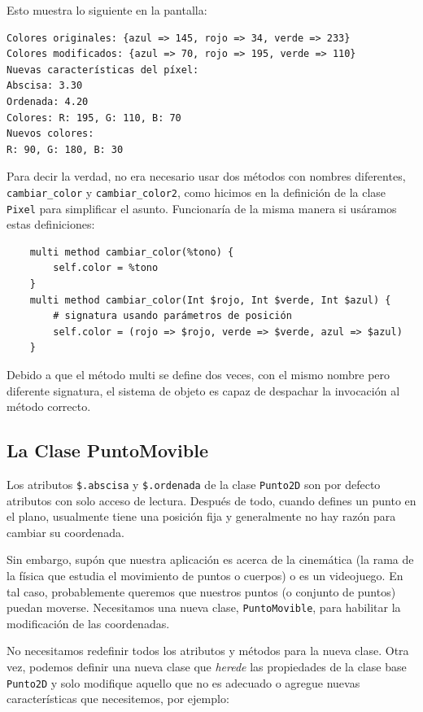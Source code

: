 Esto muestra lo siguiente en la pantalla:

\begin{verbatim}
Colores originales: {azul => 145, rojo => 34, verde => 233}
Colores modificados: {azul => 70, rojo => 195, verde => 110}
Nuevas características del píxel:
Abscisa: 3.30
Ordenada: 4.20
Colores: R: 195, G: 110, B: 70
Nuevos colores:  
R: 90, G: 180, B: 30 
\end{verbatim}

Para decir la verdad, no era necesario usar dos métodos con
nombres diferentes, \verb|cambiar_color| y \verb|cambiar_color2|,
como hicimos en la definición de la clase {\tt Pixel} para 
simplificar el asunto. Funcionaría de la misma manera si usáramos
estas definiciones:

\begin{verbatim}
    multi method cambiar_color(%tono) {
        self.color = %tono
    }
    multi method cambiar_color(Int $rojo, Int $verde, Int $azul) {
        # signatura usando parámetros de posición
        self.color = (rojo => $rojo, verde => $verde, azul => $azul)
    }
\end{verbatim} 

Debido a que el método multi se define dos veces, con el 
mismo nombre pero diferente signatura, el sistema de objeto
es capaz de despachar la invocación al método correcto.


\subsection{La Clase PuntoMovible}

Los atributos \verb|$.abscisa| y \verb|$.ordenada| de la 
clase {\tt Punto2D} son por defecto atributos con solo
acceso de lectura. Después de todo, cuando defines un punto
en el plano, usualmente tiene una posición fija y generalmente 
no hay razón para cambiar su coordenada.

Sin embargo, supón que nuestra aplicación es acerca de la
cinemática (la rama de la física que estudia el movimiento
de puntos o cuerpos) o es un videojuego. En tal caso, probablemente
queremos que nuestros puntos (o conjunto de puntos) puedan 
moverse. Necesitamos una nueva clase, {\tt PuntoMovible},
para habilitar la modificación de las coordenadas.

No necesitamos redefinir todos los atributos y métodos para
la nueva clase. Otra vez, podemos definir una nueva clase
que \emph{herede} las propiedades de la clase base {\tt Punto2D}
y solo modifique aquello que no es adecuado o agregue 
nuevas características que necesitemos, por ejemplo:

